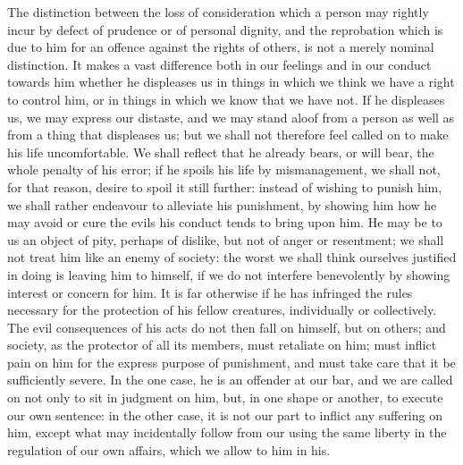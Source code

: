 \documentclass[11pt,openany]{book}
\begin{document}
The distinction between the loss of consideration which a person may rightly incur by defect of prudence or of personal dignity, and the reprobation which is due to him for an offence against the rights of others, is not a merely nominal distinction. It makes a vast difference both in our feelings and in our conduct towards him whether he displeases us in things in which we think we have a right to control him, or in things in which we know that we have not. If he displeases us, we may express our distaste, and we may stand aloof from a person as well as from a thing that displeases us; but we shall not therefore feel called on to make his life uncomfortable. We shall reflect that he already bears, or will bear, the whole penalty of his error; if he spoils his life by mismanagement, we shall not, for that reason, desire to spoil it still further: instead of wishing to punish him, we shall rather endeavour to alleviate his punishment, by showing him how he may avoid or cure the evils his conduct tends to bring upon him. He may be to us an object of pity, perhaps of dislike, but not of anger or resentment; we shall not treat him like an enemy of society: the worst we shall think ourselves justified in doing is leaving him to himself, if we do not interfere benevolently by showing interest or concern for him. It is far otherwise if he has infringed the rules necessary for the protection of his fellow creatures, individually or collectively. The evil consequences of his acts do not then fall on himself, but on others; and society, as the protector of all its members, must retaliate on him; must inflict pain on him for the express purpose of punishment, and must take care that it be sufficiently severe. In the one case, he is an offender at our bar, and we are called on not only to sit in judgment on him, but, in one shape or another, to execute our own sentence: in the other case, it is not our part to inflict any suffering on him, except what may incidentally follow from our using the same liberty in the regulation of our own affairs, which we allow to him in his.
\end{document}

